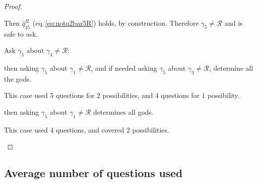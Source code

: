 \documentclass[twoside,twocolumn,a4paper,11pt]{article}
\theoremstyle{definition}
\begin{document}
\begin{proof}
\begin{description}[itemsep=2pt,topsep=3pt,leftmargin=0.6em]
\begin{description}[itemsep=2pt,topsep=1pt,leftmargin=0.6em]
\item[Case $\neg t(q_2^{\bar{5}},\gamma_2)$:]
Then $\bar{q}_{2{\bar{5}}}^R$ (eq.\,\eqref{eq:notq2bar5R}) holds, by construction. 
Therefore $\gamma_5\neq\mathcal{R}$ and is safe to ask. 

Ask $\gamma_5$ about $\gamma_4\neq\mathcal{R}$:
\begin{description}[itemsep=2pt,topsep=1pt,leftmargin=0.6em]
\item[If $\gamma_4\neq\mathcal{R}$,] then asking 
$\gamma_5$ about $\gamma_1\neq\mathcal{R}$, and if needed asking
$\gamma_5$ about $\gamma_3\neq\mathcal{R}$,
determine all the gods.

This case used $5$ questions for $2$ possibilities,
and $4$ questions for $1$ possibility.

\item[If $\gamma_4=\mathcal{R}$,] then asking 
$\gamma_5$ about $\gamma_1\neq\mathcal{R}$
determines all gods.

This case used $4$ questions, and covered $2$ possibilities.
\end{description}
\end{description}
\end{description}
\vspace{-0.45em}
\end{proof}
\vspace{-1.85em}



\subsection{Average number of questions used}
\label{sec:avg}
\end{document}
